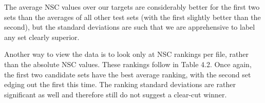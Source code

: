 \documentclass[a4paper,12pt]{report} 	%
\numberwithin{figure}{chapter}
\numberwithin{table}{chapter}
\numberwithin{equation}{chapter}
\begin{document}
\begin{flushleft}
The average NSC values over our targets are considerably better for the first two sets than the averages of all other test sets (with the first slightly better than the second), but the standard deviations are such that we are apprehensive to label any set clearly superior.

Another way to view the data is to look only at NSC rankings per file, rather than the absolute NSC values. These rankings follow in Table 4.2.
Once again, the first two candidate sets have the best average ranking, with the second set edging out the first this time. The ranking standard deviations are rather significant as well and therefore still do not suggest a clear-cut winner. 


\end{flushleft}
\end{document}
